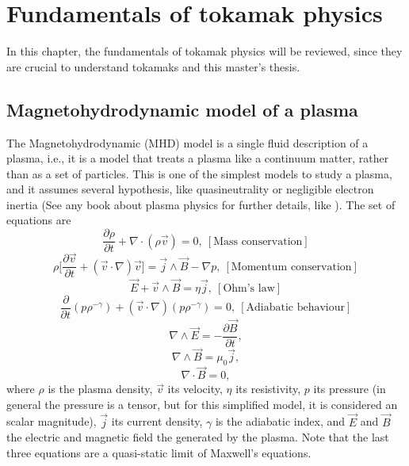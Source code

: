 \documentclass[a4paper,12pt,oneside]{book}
\newcommand{\p}{\partial}
\begin{document}
\chapter{Fundamentals of tokamak physics}

In this chapter, the fundamentals of tokamak physics will be reviewed, since they are crucial to understand tokamaks and this master's thesis.


\section{Magnetohydrodynamic model of a plasma}
The Magnetohydrodynamic (MHD) model is a single fluid description of a plasma, i.e., it is a model that treats a plasma like a continuum matter, rather than as a set of particles. This is one of the simplest models to study a plasma, and it assumes several hypothesis, like quasineutrality or negligible electron inertia (See any book about plasma physics for further details, like \cite{Chen}). The set of equations are
%
\begin{equation}
\dfrac{\p \rho}{\p t}+\nabla \cdot (\rho \vec{v})=0, \ [\text{Mass conservation}] 
\end{equation}
\begin{equation} \label{momentum cons}
\rho \Big[\dfrac{\p \vec{v}}{\p t}+(\vec{v} \cdot \nabla)\vec{v} \Big]=\vec{j} \wedge \vec{B} -\nabla p, \ [\text{Momentum  conservation}] 
\end{equation}
\begin{equation}
\vec{E} +\vec{v} \wedge \vec{B}=\eta \vec{j}, \  [\text{Ohm's  law}] 
 \end{equation}
 \begin{equation}
\dfrac{\p}{\p t}(p \rho^{-\gamma})+(\vec{v} \cdot \nabla) (p \rho^{-\gamma})=0, \ [\text{Adiabatic  behaviour}] 
\end{equation}
\begin{equation} \label{faraday}
\nabla \wedge \vec{E}=- \dfrac{\p \vec{B}}{\p t},  
\end{equation}
\begin{equation}\label{ampere}
\nabla \wedge \vec{B}=\mu_0 \vec{j}, 
\end{equation}
\begin{equation} \label{nablaBnulo}
\nabla \cdot \vec{B}=0, 
\end{equation}
%
where $\rho$ is the plasma density, $\vec{v}$ its velocity, $\eta$ its resistivity, $p$ its pressure (in general the pressure is a tensor, but for this simplified model, it is considered an scalar magnitude), $\vec{j}$ its current density, $\gamma$ is the adiabatic index, and $\vec{E}$ and $\vec{B}$ the electric and magnetic field the generated by the plasma. Note that the last three equations are a quasi-static limit of Maxwell's equations.
\end{document}
